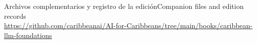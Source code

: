 \documentclass[11pt,a4paper,twoside,openany]{book}
\newcommand{\B}[2]{\ifES#2\else#1\fi}
\begin{document}
\vfill
\noindent\B{Companion files and edition records}{Archivos complementarios y registro de la edición}\\
\url{https://github.com/caribbeanai/AI-for-Caribbeans/tree/main/books/caribbean-llm-foundations}
\clearpage

\tableofcontents
\mainmatter








\appendix



\backmatter

\end{document}
